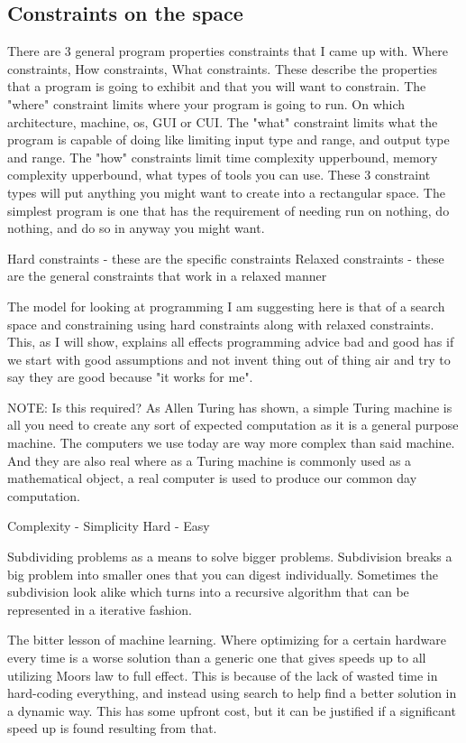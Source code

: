 \documentclass[a4paper]{article}
\begin{document}
\subsection{Constraints on the space}
There are 3 general program properties constraints that I came up with. Where constraints, 
How constraints, What constraints. These describe the properties that a program is going 
to exhibit and that you will want to constrain. The "where" constraint limits where your 
program is going to run. On which architecture, machine, os, GUI or CUI. The "what" constraint
limits what the program is capable of doing like limiting input type and range, and output
type and range. The "how" constraints limit time complexity upperbound, memory complexity 
upperbound, what types of tools you can use. These 3 constraint types will put anything you 
might want to create into a rectangular space. The simplest program is one that has the 
requirement of needing run on nothing, do nothing, and do so in anyway you might want.


Hard constraints - these are the specific constraints
Relaxed constraints - these are the general constraints that work in a relaxed manner

The model for looking at programming I am suggesting here is that of a search space and constraining using hard constraints along with relaxed constraints. This, as I will show, explains all effects programming advice bad and good has if we start with good assumptions and not invent thing out of thing air and try to say they are good because "it works for me". 

NOTE: Is this required? 
As Allen Turing has shown, a simple Turing machine is all you need to create any sort of expected computation as it is a general purpose machine. The computers we use today are way more complex than said machine. And they are also real where as a Turing machine is commonly used as a mathematical object, a real computer is used to produce our common day computation.


Complexity - Simplicity 
Hard - Easy 

Subdividing problems as a means to solve bigger problems. Subdivision breaks a big problem into smaller ones that you can digest individually. Sometimes the subdivision look alike which turns into a recursive algorithm that can be represented in a iterative fashion. 

The bitter lesson of machine learning. Where optimizing for a certain hardware every time is a worse solution than a generic one that gives speeds up to all utilizing Moors law to full effect. This is because of the lack of wasted time in hard-coding everything, and instead using search to help find a better solution in a dynamic way. This has some upfront cost, but it can be justified if a significant speed up is found resulting from that. 
\end{document}
